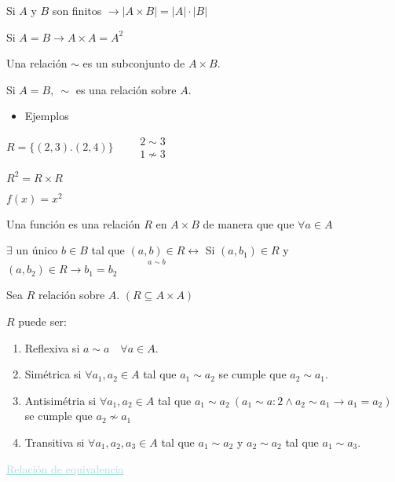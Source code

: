 \documentclass[12pt]{article}
\begin{document}
Si $A$ y $B$ son finitos $\longrightarrow|A\times B|=|A|\cdot |B|$

Si $A=B\longrightarrow A\times A=A^2$

Una relación $\sim$ es un subconjunto de $A\times B$.

Si $A=B,~\sim$ es una relación sobre $A$.

\begin{itemize}[label=\color{red}\textbullet, leftmargin=*]
	\item \color{lightblue}Ejemplos
\end{itemize}
$R=\{(2,3). (2,4)\}\qquad\begin{array}{l}
	2\sim 3\\
	1\nsim 3
\end{array}$

$R^2=R\times R$

$f(x)=x^2$

Una función es una relación  $R$ en $A\times B$ de manera que que $\forall a\in A$

$\exists$ un único $b\in B$ tal que $\underset{\displaystyle a\sim b}{(a,b)\in R}\longleftrightarrow $ Si $(a,b_1)\in R$ y $(a,b_2)\in R\longrightarrow b_1=b_2$


Sea $R$ relación sobre $A$. $(R\subseteq A\times A)$

$R$ puede ser:
\begin{enumerate}[label=\arabic*)]
	\item Reflexiva si $a\sim a\quad\forall a\in A$.
	\item Simétrica si $\forall a_1,a_2\in A$ tal que $a_1\sim a_2$ se cumple que $a_2\sim a_1$.
	\item Antisimétria si $\forall a_1,a_2\in A$ tal que $a_1\sim a_2~(a_1\sim a:2 \wedge a_2\sim a_1\longrightarrow a_1=a_2)$ se cumple que $a_2\nsim a_1$
	\item Transitiva si $\forall a_1,a_2,a_3\in A$ tal que $a_1\sim a_2$ y $a_2\sim a_2$ tal que $a_1\sim a_3$.
\end{enumerate}
\textcolor{lightblue}{\underline{Relación de equivalencia}}
\end{document}
